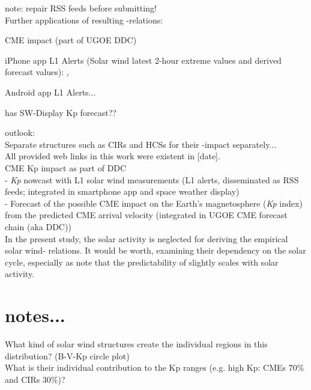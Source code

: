 {note: repair RSS feeds before submitting!\\

\noindent Further applications of resulting \Kp{}-relations:
\begin{itemize*}
	\item CME \Kp{} impact (part of UGOE DDC)
	\item iPhone app L1 Alerts (Solar wind latest 2-hour extreme values and derived forecast values): , 
	\item Android app L1 Alerts... 
	\item has SW-Display Kp forecast??
\end{itemize*}

outlook:\\
Separate structures such as CIRs and HCSs for their \Kp-impact separately...\\

All provided web links in this work were existent in [date].\\


CME Kp impact as part of DDC\\
- \textit{Kp} nowcast with L1 solar wind measurements (L1 alerts, disseminated as RSS feeds; integrated in smartphone app and space weather display)\\
- Forecast of the possible CME impact on the Earth's magnetosphere (\textit{Kp} index) from the predicted CME arrival velocity (integrated in UGOE CME forecast chain (aka DDC))\\

In the present study, the solar activity is neglected for deriving the empirical solar wind-\Kp{} relations. It would be worth, examining their dependency on the solar cycle, especially as \citet{Wing2005} note that the predictability of \Kp{} slightly scales with solar activity.\\


\section{notes...}

What kind of solar wind structures create the individual regions in this distribution? (B-V-Kp circle plot)\\
What is their individual contribution to the Kp ranges (e.g. high Kp: CMEs 70\% and CIRs 30\%)?\\

}
